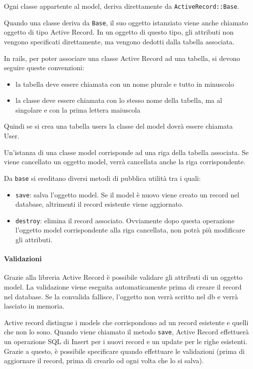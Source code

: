 \documentclass[11pt,a4paper]{article}
\begin{document}
Ogni classe appartente al model, deriva direttamente da \verb|ActiveRecord::Base|.


Quando una classe deriva da \verb|Base|, il suo oggetto istanziato viene anche chiamato oggetto di tipo Active Record.
In un oggetto di questo tipo, gli attributi non vengono specificati direttamente, ma vengono dedotti dalla tabella associata.


In rails, per poter associare una classe Active Record ad una tabella, si devono seguire queste convenzioni:
\begin{itemize}
 \item la tabella deve essere chiamata con un nome plurale e tutto in minuscolo
 \item la classe deve essere chiamata con lo stesso nome della tabella, ma al singolare e con la prima lettera maiuscola
\end{itemize}
Quindi se si crea una tabella users la classe del model dovrà essere chiamata User.


Un'istanza di una classe model corrisponde ad una riga della tabella associata.
Se viene cancellato un oggetto model, verrà cancellata anche la riga corrispondente.


Da \verb|base| si ereditano diversi metodi di pubblica utilità tra i quali:
\begin{itemize}
 \item \verb|save|: salva l'oggetto model. Se il model è nuovo viene creato un record nel database, altrimenti il record esistente viene aggiornato.
 \item \verb|destroy|: elimina il record associato. Ovviamente dopo questa operazione l'oggetto model corrispondente alla riga cancellata, non potrà più modificare gli attributi.
\end{itemize}
\paragraph{Validazioni}
Grazie alla libreria Active Record è possibile validare gli attributi di un oggetto model. La validazione viene eseguita automaticamente prima di creare il record nel database. Se la convalida fallisce, l'oggetto non verrà scritto nel db e verrà lasciato in memoria.


Active record distingue i models che corrispondono ad un record esistente e quelli che non lo sono. Quando viene chiamato il metodo \verb|save|, Active Record effettuerà un operazione SQL di Insert per i nuovi record e un update per le righe esistenti. Grazie a questo, è possibile specificare quando effettuare le validazioni (prima di aggiornare il record, prima di crearlo od ogni volta che lo si salva).
\end{document}
